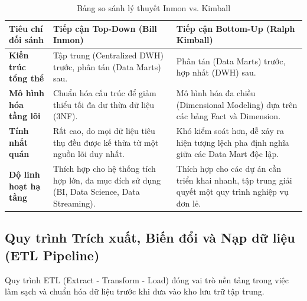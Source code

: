\documentclass[12pt,a4paper]{article}
\begin{document}
\begin{table}[htbp]
\centering
\begin{tabular}{p{3.5cm} p{5.5cm} p{5.5cm}}
\toprule

\textbf{Tiêu chí đối sánh} & \textbf{Tiếp cận Top-Down (Bill Inmon)} & \textbf{Tiếp cận Bottom-Up (Ralph Kimball)} \\ 
\midrule

\textbf{Kiến trúc tổng thể} & 
Tập trung (Centralized DWH) trước, phân tán (Data Marts) sau. & 
Phân tán (Data Marts) trước, hợp nhất (DWH) sau. \\

\textbf{Mô hình hóa tầng lõi} & 
Chuẩn hóa cấu trúc để giảm thiểu tối đa dư thừa dữ liệu (3NF). & 
Mô hình hóa đa chiều (Dimensional Modeling) dựa trên các bảng Fact và Dimension. \\

\textbf{Tính nhất quán} & 
Rất cao, do mọi dữ liệu tiêu thụ đều được kế thừa từ một nguồn lõi duy nhất. & 
Khó kiểm soát hơn, dễ xảy ra hiện tượng lệch pha định nghĩa giữa các Data Mart độc lập. \\

\textbf{Độ linh hoạt hạ tầng} & 
Thích hợp cho hệ thống tích hợp lớn, đa mục đích sử dụng (BI, Data Science, Data Streaming). & 
Thích hợp cho các dự án cần triển khai nhanh, tập trung giải quyết một quy trình nghiệp vụ đơn lẻ. \\
\bottomrule
\end{tabular}
\caption{Bảng so sánh lý thuyết Inmon vs. Kimball}
\label{tab:comparison}
\end{table}

\subsection{Quy trình Trích xuất, Biến đổi và Nạp dữ liệu (ETL Pipeline)}
\label{sec:etl_theory}

Quy trình ETL (Extract - Transform - Load) đóng vai trò nền tảng trong việc làm sạch và chuẩn hóa dữ liệu trước khi đưa vào kho lưu trữ tập trung.
\end{document}
